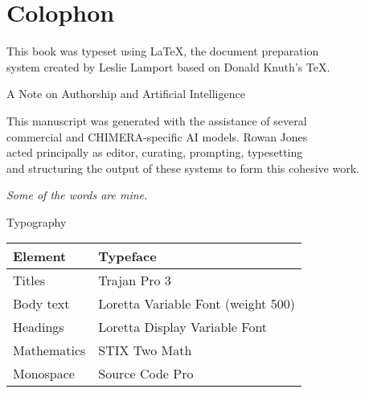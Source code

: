 
\chapter*{Colophon}

\begin{center}

\vspace{1.5cm}

This book was typeset using \LaTeX{}, the document preparation\\
system created by Leslie Lamport based on Donald Knuth's \TeX{}.

\vspace{2cm}

{\lorettamedium\Large A Note on Authorship and Artificial Intelligence}

\vspace{1cm}

This manuscript was generated with the assistance of several\\
commercial and CHIMERA-specific AI models. Rowan Jones\\
acted principally as editor, curating, prompting, typesetting\\
and structuring the output of these systems to form this cohesive work.

\vspace{0.8cm}

{\itshape Some of the words are mine.}

\vspace{2.5cm}

{\lorettamedium\large Typography}

\vspace{0.8cm}

\begin{tabular}{@{}ll@{}}
\toprule
\tableheaderfont Element & \tableheaderfont Typeface \\
\midrule
Titles & Trajan Pro 3 \\
Body text & Loretta Variable Font (weight 500) \\
Headings & Loretta Display Variable Font \\
Mathematics & STIX Two Math \\
Monospace & Source Code Pro \\
\bottomrule
\end{tabular}


\end{center}
